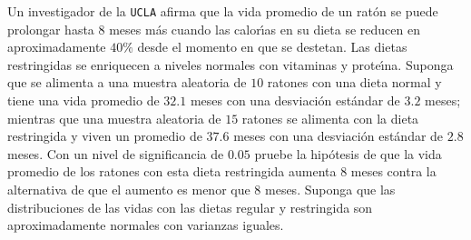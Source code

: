 \begin{enunciado}
 Un investigador de la \texttt{UCLA} afirma que la vida promedio de un rat\'on se puede prolongar hasta $8$ meses m\'as cuando las calor\'{\i}as en su dieta se reducen en aproximadamente $40\%$ desde el momento en que se destetan. Las dietas restringidas se enriquecen a niveles normales con vitaminas y prote\'{\i}na. Suponga que se alimenta a una muestra aleatoria de $10$ ratones con una dieta normal y tiene una vida promedio de $32.1$ meses con una desviaci\'on est\'andar de $3.2$ meses; mientras que una muestra aleatoria de $15$ ratones se alimenta con la dieta restringida y viven un promedio de $37.6$ meses con una desviaci\'on est\'andar de $2.8$ meses. Con un nivel de significancia de $0.05$ pruebe la hip\'otesis de que la vida promedio de los ratones con esta dieta restringida aumenta $8$ meses contra la alternativa de que el aumento es menor que $8$ meses. Suponga que las distribuciones de las vidas con las dietas regular y restringida son aproximadamente normales con varianzas iguales.
\end{enunciado}

